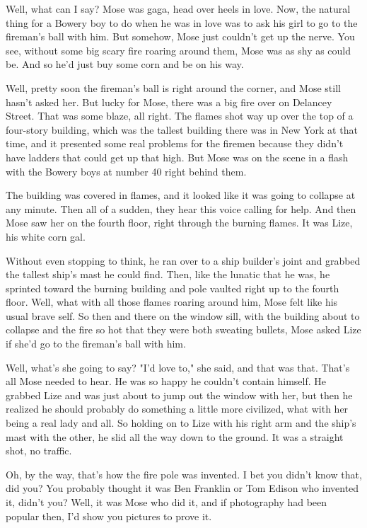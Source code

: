 Well, what can I say? Mose was gaga, head over heels in love. Now, the natural thing for a Bowery boy to do when he was in love was to ask his girl to go to the fireman's ball with him. But somehow, Mose just couldn't get up the nerve. You see, without some big scary fire roaring around them, Mose was as shy as could be. And so he'd just buy some corn and be on his way.

Well, pretty soon the fireman's ball is right around the corner, and Mose still hasn't asked her. But lucky for Mose, there was a big fire over on Delancey Street. That was some blaze, all right. The flames shot way up over the top of a four-story building, which was the tallest building there was in New York at that time, and it presented some real problems for the firemen because they didn't have ladders that could get up that high. But Mose was on the scene in a flash with the Bowery boys at number 40 right behind them.

The building was covered in flames, and it looked like it was going to collapse at any minute. Then all of a sudden, they hear this voice calling for help. And then Mose saw her on the fourth floor, right through the burning flames. It was Lize, his white corn gal.

Without even stopping to think, he ran over to a ship builder's joint and grabbed the tallest ship's mast he could find. Then, like the lunatic that he was, he sprinted toward the burning building and pole vaulted right up to the fourth floor. Well, what with all those flames roaring around him, Mose felt like his usual brave self. So then and there on the window sill, with the building about to collapse and the fire so hot that they were both sweating bullets, Mose asked Lize if she'd go to the fireman's ball with him.

Well, what's she going to say? "I'd love to," she said, and that was that. That's all Mose needed to hear. He was so happy he couldn't contain himself. He grabbed Lize and was just about to jump out the window with her, but then he realized he should probably do something a little more civilized, what with her being a real lady and all. So holding on to Lize with his right arm and the ship's mast with the other, he slid all the way down to the ground. It was a straight shot, no traffic.

Oh, by the way, that's how the fire pole was invented. I bet you didn't know that, did you? You probably thought it was Ben Franklin or Tom Edison who invented it, didn't you? Well, it was Mose who did it, and if photography had been popular then, I'd show you pictures to prove it.

